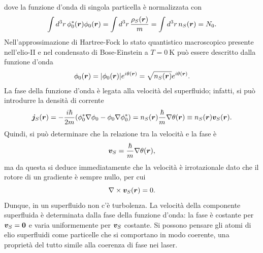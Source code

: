 dove la funzione d'onda di singola particella è normalizzata con
\begin{equation}
\label{eq: normalizzazione funzione d'onda in approssimazione di Hartree-Fock}
    \int d^3r\,\phi_0^*(\bm{r})\phi_0(\bm{r}) = \int d^3r\,\frac{\rho_S(\bm{r})}{m} = \int d^3r\,n_S(\bm{r}) = N_0.
\end{equation}
Nell'approssimazione di Hartree-Fock lo stato quantistico macroscopico presente nell'elio-II e nel condensato di Bose-Einstein a $T = \SI{0}{\kelvin}$ può essere descritto dalla funzione d'onda
\begin{equation}
    \phi_0(\bm{r}) = |\phi_0(\bm{r})|e^{i\theta(\bm{r})} = \sqrt{n_S(\bm{r})}e^{i\theta(\bm{r})}.
\end{equation}
La fase della funzione d'onda è legata alla velocità del superfluido; infatti, si può introdurre la densità di corrente
\begin{equation}
    \bm{j}_S(\bm{r}) = -\frac{i\hbar}{2m}(\phi_0^*\nabla\phi_0 - \phi_0\nabla\phi_0^*) = n_S(\bm{r})\frac{\hbar}{m}\nabla\theta(\bm{r}) \equiv n_S(\bm{r})\bm{v}_S(\bm{r}).
\end{equation}
Quindi, si può determinare che la relazione tra la velocità e la fase è
\begin{equation}
    \bm{v}_S = \frac{\hbar}{m}\nabla\theta(\bm{r}),
\end{equation}
ma da questa si deduce immediatamente che la velocità è irrotazionale dato che il rotore di un gradiente è sempre nullo, per cui
\begin{equation}
    \nabla \times \bm{v}_S(\bm{r}) = 0.
\end{equation}
Dunque, in un superfluido non c'è turbolenza. La velocità della componente superfluida è determinata dalla fase della funzione d'onda: la fase è costante per $\bm{v}_S = \bm{0}$ e varia uniformemente per $\bm{v}_S$ costante. Si possono pensare gli atomi di elio superfluidi come particelle che si comportano in modo coerente, una proprietà del tutto simile alla coerenza di fase nei laser. 

